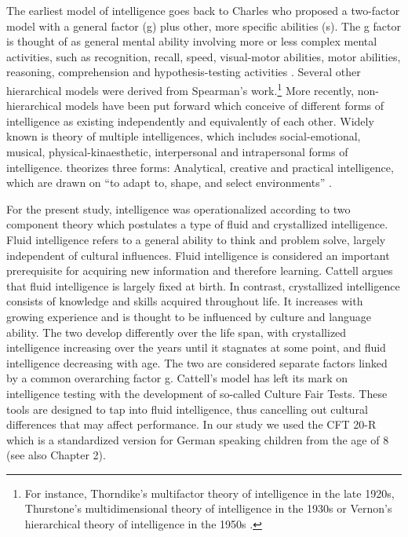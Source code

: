 \documentclass[output=paper]{langscibook}
\begin{document}
The earliest model of intelligence goes back to Charles \citet{Spearman1904} who proposed a two-factor model with a general factor (g) plus other, more specific abilities (s). The g factor is thought of as general mental ability involving more or less complex mental activities, such as recognition, recall, speed, visual-motor abilities, motor abilities, reasoning, comprehension and hypothesis-testing activities \citep{Sattler2001}. Several other hierarchical models were derived from Spearman’s work.\footnote{For instance, Thorndike’s multifactor theory of intelligence in the late 1920s, Thurstone’s multidimensional theory of intelligence in the 1930s or Vernon’s hierarchical theory of intelligence in the 1950s \citep{Sattler2001}.} More recently, non-hierarchical models have been put forward which conceive of different forms of intelligence as existing independently and equivalently of each other. Widely known is  theory of multiple intelligences, which includes social-emotional, musical, physical-kinaesthetic, interpersonal and intrapersonal forms of intelligence. \citet{Sternberg1985,Sternberg2002} theorizes three forms: Analytical, creative and practical intelligence, which are drawn on “to adapt to, shape, and select environments” \citep[15]{Sternberg2002}.

For the present study, intelligence was operationalized according to  two component theory which postulates a type of fluid and crystallized intelligence. Fluid intelligence refers to a general ability to think and problem solve, largely independent of cultural influences. Fluid intelligence is considered an important prerequisite for acquiring new information and therefore learning. Cattell argues that fluid intelligence is largely fixed at birth. In contrast, crystallized intelligence consists of knowledge and skills acquired throughout life. It increases with growing experience and is thought to be influenced by culture and language ability. The two develop differently over the life span, with crystallized intelligence increasing over the years until it stagnates at some point, and fluid intelligence decreasing with age. The two are considered separate factors linked by a common overarching factor g.  Cattell’s model has left its mark on intelligence testing with the development of so-called Culture Fair Tests. These tools are designed to tap into fluid intelligence, thus cancelling out cultural differences that may affect performance. In our study we used the CFT 20-R which is a standardized version for German speaking children from the age of 8 (see also Chapter 2).
\end{document}
